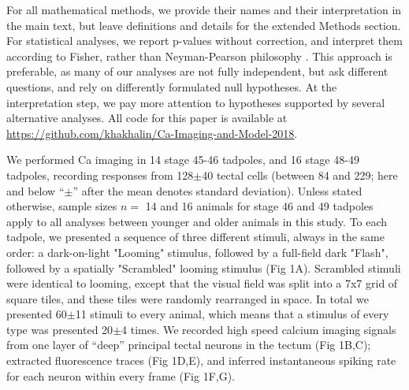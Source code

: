 \documentclass{article}
\begin{document}
For all mathematical methods, we provide their names and their interpretation in the main text, but leave definitions and details for the extended Methods section. For statistical analyses, we report p-values without correction, and interpret them according to Fisher, rather than Neyman-Pearson philosophy \citep{greenland2016}. This approach is preferable, as many of our analyses are not fully independent, but ask different questions, and rely on differently formulated null hypotheses. At the interpretation step, we pay more attention to hypotheses supported by several alternative analyses. All code for this paper is available at \url{https://github.com/khakhalin/Ca-Imaging-and-Model-2018}.


We performed Ca imaging in 14 stage 45-46 tadpoles, and 16 stage 48-49 tadpoles, recording responses from 128$\pm$40 tectal cells (between 84 and 229; here and below “$\pm$” after the mean denotes standard deviation). Unless stated otherwise, sample sizes $n=$ 14 and 16 animals for stage 46 and 49 tadpoles apply to all analyses between younger and older animals in this study. To each tadpole, we presented a sequence of three different stimuli, always in the same order: a dark-on-light "Looming" stimulus, followed by a full-field dark "Flash", followed by a spatially "Scrambled" looming stimulus (Fig 1A). Scrambled stimuli were identical to looming, except that the visual field was split into a 7x7 grid of square tiles, and these tiles were randomly rearranged in space. In total we presented 60$\pm$11 stimuli to every animal, which means that a stimulus of every type was presented 20$\pm$4 times. We recorded high speed calcium imaging signals \citep{xu2011,truszkowski2017} from one layer of “deep” principal tectal neurons in the tectum (Fig 1B,C); extracted fluorescence traces (Fig 1D,E), and inferred instantaneous spiking rate for each neuron within every frame (Fig 1F,G).
\end{document}
